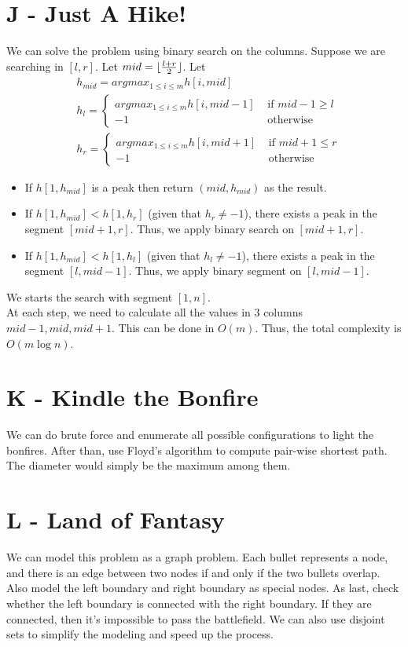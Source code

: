 \documentclass{article}
\DeclarePairedDelimiter\floor{\lfloor}{\rfloor}
\begin{document}
\section*{J - Just A Hike!}
We can solve the problem using binary search on the columns. Suppose we are searching in $[l, r]$. 
Let $mid = \floor{\frac{l + r}{2}}$. Let 
\begin{equation}
\begin{split}
&h_{mid} = argmax_{1 \leq i \leq m} h[i, mid]\\
&h_l = 
\begin{cases}
argmax_{1 \leq i \leq m} h[i, mid - 1] & \text{ if $mid - 1 \geq l$}\\
-1 & \text{ otherwise}
\end{cases}\\
&h_r = 
\begin{cases}
argmax_{1 \leq i \leq m} h[i, mid + 1] & \text{ if $mid + 1 \leq r$}\\
-1 & \text{ otherwise}
\end{cases}
\end{split}
\end{equation}
\begin{itemize}
\item
If $h[1, h_{mid}]$ is a peak then return $(mid, h_{mid})$ as the result.
\item
If $h[1, h_{mid}] < h[1, h_r]$ (given that $h_r \neq -1$), there exists a peak in the segment $[mid + 1, r]$. Thus,
we apply binary search on $[mid + 1, r]$.
\item
If $h[1, h_{mid}] < h[1, h_l]$ (given that $h_l \neq -1$), there exists a peak in the segment $[l, mid - 1]$. Thus, we apply binary segment on $[l, mid - 1]$.
\end{itemize}
We starts the search with segment $[1, n]$.\\

\noindent At each step, we need to calculate all the values in $3$ columns $mid - 1, mid, mid + 1$. This can be done in $O(m)$. Thus, the total complexity is $O(m\log{n})$.

\section*{K - Kindle the Bonfire}
We can do brute force and enumerate all possible configurations to light the bonfires. After than, use Floyd's algorithm to compute pair-wise shortest path. The diameter would simply be the maximum among them.


\section*{L - Land of Fantasy}
We can model this problem as a graph problem. Each bullet represents a node, and there is an edge between two nodes if and only if the two bullets overlap. Also model the left
boundary and right boundary as special nodes. As last, check whether the left boundary is connected with the right boundary. If they are connected, then it's impossible to pass the battlefield. We can also use disjoint sets to simplify the modeling and speed up the process.
\end{document}

